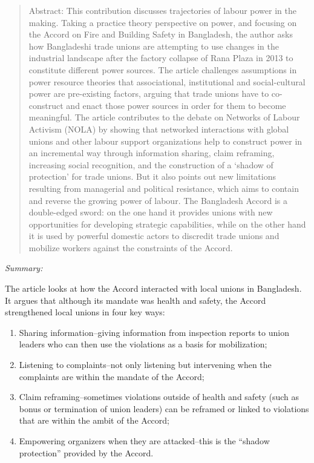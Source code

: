 \documentclass[
  12pt,
]{article}
\providecommand{\tightlist}{%
  \setlength{\itemsep}{0pt}\setlength{\parskip}{0pt}}
\begin{document}
\begin{quote}
Abstract: 
This contribution discusses trajectories of labour power in the making. Taking a practice theory perspective on power, and focusing on the Accord on Fire and Building Safety in Bangladesh, the author asks how Bangladeshi trade unions are attempting to use changes in the industrial landscape after the factory collapse of Rana Plaza in 2013 to constitute different power sources. The article challenges assumptions in power resource theories that associational, institutional and social-cultural power are pre-existing factors, arguing that trade unions have to co-construct and enact those power sources in order for them to become meaningful. The article contributes to the debate on Networks of Labour Activism (NOLA) by showing that networked interactions with global unions and other labour support organizations help to construct power in an incremental way through information sharing, claim reframing, increasing social recognition, and the construction of a `shadow of protection' for trade unions. But it also points out new limitations resulting from managerial and political resistance, which aims to contain and reverse the growing power of labour. The Bangladesh Accord is a double-edged sword: on the one hand it provides unions with new opportunities for developing strategic capabilities, while on the other hand it is used by powerful domestic actors to discredit trade unions and mobilize workers against the constraints of the Accord.
\end{quote}

\emph{Summary:}

The article looks at how the Accord interacted with local unions in
Bangladesh. It argues that although its mandate was health and safety,
the Accord strengthened local unions in four key ways:

\begin{enumerate}
\def\labelenumi{\arabic{enumi})}
\tightlist
\item
  Sharing information--giving information from inspection reports to
  union leaders who can then use the violations as a basis for
  mobilization;
\item
  Listening to complaints--not only listening but intervening when the
  complaints are within the mandate of the Accord;
\item
  Claim reframing--sometimes violations outside of health and safety
  (such as bonus or termination of union leaders) can be reframed or
  linked to violations that are within the ambit of the Accord;
\item
  Empowering organizers when they are attacked--this is the ``shadow
  protection'' provided by the Accord.
\end{enumerate}
\end{document}
